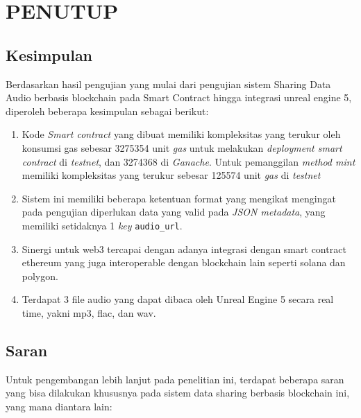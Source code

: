 \chapter{PENUTUP}
\label{chap:penutup}


\section{Kesimpulan}
\label{sec:kesimpulan}

Berdasarkan hasil pengujian yang mulai dari pengujian sistem Sharing Data Audio berbasis blockchain pada Smart Contract hingga integrasi unreal engine 5, diperoleh beberapa kesimpulan sebagai berikut:

\begin{enumerate}[nolistsep]

  \item Kode \emph{Smart contract} yang dibuat memiliki kompleksitas yang terukur oleh konsumsi gas sebesar 3275354 unit \emph{gas} untuk melakukan \emph{deployment smart contract} di \emph{testnet}, dan 3274368 di \emph{Ganache}. Untuk pemanggilan \emph{method mint} memiliki kompleksitas yang terukur sebesar 125574 unit \emph{gas} di \emph{testnet}

  \item Sistem ini memiliki beberapa ketentuan format yang mengikat mengingat pada pengujian diperlukan data yang valid pada \emph{JSON metadata}, yang memiliki setidaknya 1 \emph{key} \texttt{audio\_url}.

  \item Sinergi untuk web3 tercapai dengan adanya integrasi dengan smart contract ethereum yang juga interoperable dengan blockchain lain seperti solana dan polygon.

  \item Terdapat 3 file audio yang dapat dibaca oleh Unreal Engine 5 secara real time, yakni mp3, flac, dan wav.

\end{enumerate}

\section{Saran}
\label{chap:saran}

Untuk pengembangan lebih lanjut pada penelitian ini, terdapat beberapa saran yang bisa dilakukan khususnya pada sistem data sharing berbasis blockchain ini, yang mana diantara lain:

